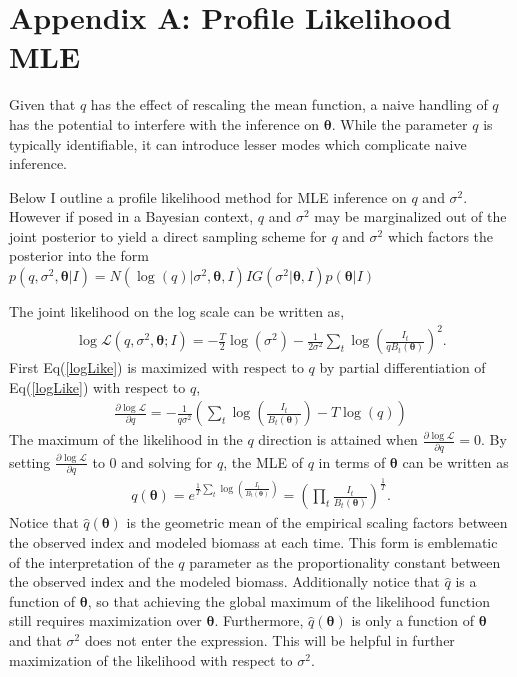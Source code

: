 \documentclass[12pt]{article}
\begin{document}
\clearpage
\section*{Appendix A: Profile Likelihood MLE \label{appMLE}}
Given that $q$ has the effect of rescaling the mean function, a 
naive handling of $q$ has the potential to interfere with the inference on 
$\bm{\theta}$. While the parameter $q$ is typically identifiable, it can 
introduce lesser modes which complicate naive inference.

%
Below I outline a profile likelihood method for MLE inference on $q$ and 
$\sigma^2$. However if posed in a %
Bayesian context, $q$ and 
$\sigma^2$ may be marginalized out of the joint posterior to yield a direct 
sampling scheme for $q$ and $\sigma^2$ which factors the posterior into the 
form $p(q, \sigma^2, \bm{\theta}|I) = N(\log(q)| \sigma^2, \bm{\theta}, I) IG(\sigma^2|\bm{\theta}, I) p(\bm{\theta}|I)$ 

%
The joint likelihood on the log scale can be written as, 
\begin{align}
\log\mathcal{L}(q, \sigma^2, \bm{\theta}; I) = - \frac{T}{2}\log(\sigma^2) - \frac{1}{2\sigma^2}\sum_t \log\left(\frac{I_t}{qB_t(\bm{\theta})}\right)^2. \label{logLike} 
\end{align}
%
First Eq(\ref{logLike}) is maximized with respect to $q$ by partial 
differentiation of Eq(\ref{logLike}) with respect to $q$, 
%
\begin{align}
\frac{\partial \log\mathcal{L}}{\partial q} = -\frac{1}{q\sigma^2}\left(\sum_t \log\left(\frac{I_t}{B_t(\bm{\theta})}\right) - T\log(q)\right)
\end{align}
%
The maximum of the likelihood in the $q$ direction is attained when 
$\frac{\partial \log\mathcal{L}}{\partial q}=0$. By setting 
$\frac{\partial \log\mathcal{L}}{\partial q}$ to 0 and solving for 
$q$, the MLE of $q$ in terms of $\bm{\theta}$ can be written as
%
\begin{align}
q(\bm{\theta}) = e^{ \frac{1}{T}\sum_t \log\left(\frac{I_t}{B_t(\bm{\theta})}\right) } = \left(\prod_t\frac{I_t}{B_t(\bm{\theta})}\right)^{\frac{1}{T}}. \label{qHat}
\end{align}
%
Notice that $\hat q(\bm{\theta})$ is the geometric mean of the empirical 
scaling factors between the observed index and modeled biomass at each time. 
This form is emblematic of the interpretation of the $q$ parameter as the 
proportionality constant between the observed index and the modeled biomass. 
Additionally notice that $\hat q$ is a function of $\bm\theta$, so that 
achieving the global maximum of the likelihood function still requires 
maximization over $\bm\theta$. Furthermore, $\hat q(\bm{\theta})$ is only a 
function of $\bm{\theta}$ and that $\sigma^2$ does not enter the expression.  
This will be helpful in further maximization of the likelihood with respect to 
$\sigma^2$.  
\end{document}

